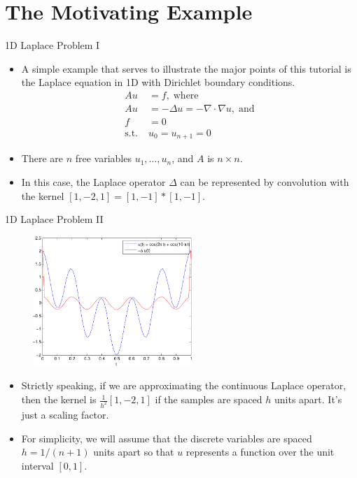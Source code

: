 \documentclass{beamer}
\begin{document}
\section{The Motivating Example}%

\begin{frame}{1D Laplace Problem I}
 \begin{itemize}
  \item A simple example that serves to illustrate the major points of this
        tutorial is the Laplace equation in 1D with Dirichlet boundary
        conditions.
  \begin{align}
   Au &= f, \; \text{where} \label{eq:laplace} \\
   Au &= -\Delta u = - \nabla \cdot \nabla u, \; \text{and} \nonumber \\
   f &= 0 \nonumber \\
   \text{s.t.} \; & u_0 = u_{n+1} = 0 \nonumber
  \end{align}
  \item There are $n$ free variables $u_1,\dotsc,u_n$, and $A$ is $n \times n$.
  \item In this case, the Laplace operator $\Delta$ can be represented by
        convolution with the kernel $[1,-2,1] = [1,-1]\ast[1,-1]$.
 \end{itemize}
\end{frame}

\begin{frame}{1D Laplace Problem II}
 \begin{figure}
  \includegraphics[width=6cm]{images/laplaceOperatorExample.pdf}
 \end{figure}
 \begin{itemize}
  \item Strictly speaking, if we are approximating the continuous Laplace
        operator, then the kernel is $\frac{1}{h^2}[1,-2,1]$ if the samples
        are spaced $h$ units apart. It's just a scaling factor.
  \item For simplicity, we will assume that the discrete variables are spaced
        $h = 1/(n+1)$ units apart so that $u$ represents a function over the
        unit interval $[0,1]$.
 \end{itemize}
\end{frame}
\end{document}
